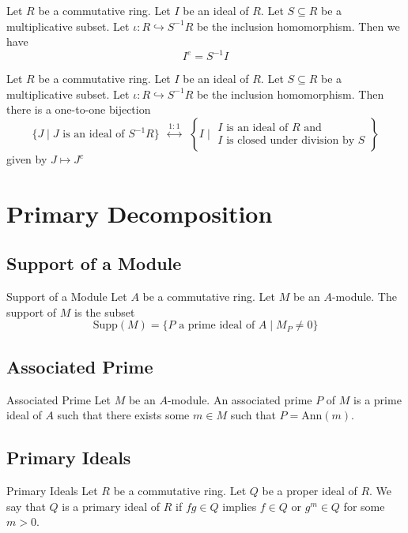 \documentclass[a4paper]{article}
\begin{document}
\begin{lmm} Let $R$ be a commutative ring. Let $I$ be an ideal of $R$. Let $S\subseteq R$ be a multiplicative subset. Let $\iota:R\hookrightarrow S^{-1}R$ be the inclusion homomorphism. Then we have $$I^e=S^{-1}I$$
\end{lmm}

\begin{thm}{}{} Let $R$ be a commutative ring. Let $I$ be an ideal of $R$. Let $S\subseteq R$ be a multiplicative subset. Let $\iota:R\hookrightarrow S^{-1}R$ be the inclusion homomorphism. Then there is a one-to-one bijection $$\{J\;|\;J\text{ is an ideal of }S^{-1}R\}\;\;\overset{1:1}{\longleftrightarrow}\;\;\left\{I\;|\;\substack{I\text{ is an ideal of }R\text{ and }\\I\text{ is closed under division by }S}\right\}$$ given by $J\mapsto J^c$
\end{thm}

\pagebreak
\section{Primary Decomposition}
\subsection{Support of a Module}
\begin{defn}{Support of a Module}{} Let $A$ be a commutative ring. Let $M$ be an $A$-module. The support of $M$ is the subset $$\text{Supp}(M)=\{P\text{ a prime ideal of }A\;|\;M_P\neq 0\}$$
\end{defn}

\subsection{Associated Prime}
\begin{defn}{Associated Prime}{} Let $M$ be an $A$-module. An associated prime $P$ of $M$ is a prime ideal of $A$ such that there exists some $m\in M$ such that $P=\text{Ann}(m)$. 
\end{defn}

\subsection{Primary Ideals}
\begin{defn}{Primary Ideals}{} Let $R$ be a commutative ring. Let $Q$ be a proper ideal of $R$. We say that $Q$ is a primary ideal of $R$ if $fg\in Q$ implies $f\in Q$ or $g^m\in Q$ for some $m>0$. 
\end{defn}
\end{document}
